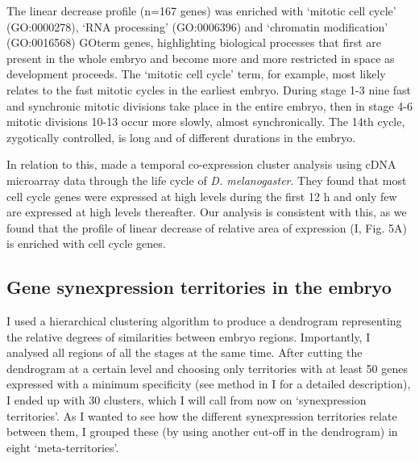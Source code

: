 The linear decrease profile (n=167 genes) was enriched with `mitotic cell cycle' (GO:0000278), `RNA processing' (GO:0006396) and `chromatin modification' (GO:0016568) GOterm genes, highlighting biological processes that first are present in the whole embryo and become more and more restricted in space as development proceeds.
The `mitotic cell cycle' term, for example, most likely relates to the fast mitotic cycles in the earliest embryo. During stage 1-3 nine fast and synchronic mitotic divisions take place in the entire embryo, then in stage 4-6 mitotic divisions 10-13 occur more slowly, almost synchronically. The 14th cycle, zygotically controlled, is long and of different durations in the embryo.

In relation to this, \citet{Arbeitman2002} made a temporal co-expression cluster analysis using cDNA microarray data through the life cycle of \textit{D. melanogaster}. They found that most cell cycle genes were expressed at high levels during the first 12 h and only few are expressed at high levels thereafter.
Our analysis is consistent with this, as we found that the profile of linear decrease of relative area of expression (I, Fig. 5A) is enriched with cell cycle genes. 

\subsection{Gene synexpression territories in the embryo}
I used a hierarchical clustering algorithm to produce a dendrogram representing the relative degrees of similarities between embryo regions.
Importantly, I analysed all regions of all the stages at the same time.
After cutting the dendrogram at a certain level and choosing only territories with at least 50 genes expressed with a minimum specificity (see method in I for a detailed description), I ended up with 30 clusters, which I will call from now on `synexpression territories'.
As I wanted to see how the different synexpression territories relate between them, I grouped these (by using another cut-off in the dendrogram) in eight `meta-territories'.


